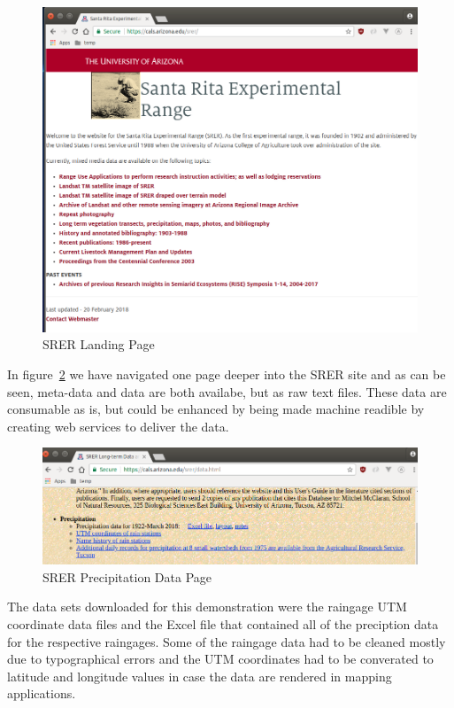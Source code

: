 \begin{figure}[htb]
  \centering\includegraphics[width=\columnwidth]{./images/srer_landing_page.png}
  \caption{SRER Landing Page \cite{hid505SrerWebSite2018}}\label{f:srer_landing_page}
\end{figure}


In figure~\ref{f:srer_precip_data_page} we have navigated one page deeper into the 
SRER site and as can be seen, meta-data and data are both availabe, but as raw 
text files.  These data are consumable as is, but could be enhanced by being 
made machine readible by creating web services to deliver the data.

\begin{figure}[htb]
  \centering\includegraphics[width=\columnwidth]{./images/srer_precip_data_page.png}
  \caption{SRER Precipitation Data Page \cite{hid505SrerWebSite2018}}\label{f:srer_precip_data_page}
\end{figure}

The data sets downloaded for this demonstration were the raingage UTM 
coordinate data files and the Excel file that contained all of the preciption 
data for the respective raingages.  Some of the raingage data had to be cleaned 
mostly due to typographical errors and the UTM coordinates had to be 
converated to latitude and longitude values in case the data are rendered in 
mapping applications.

